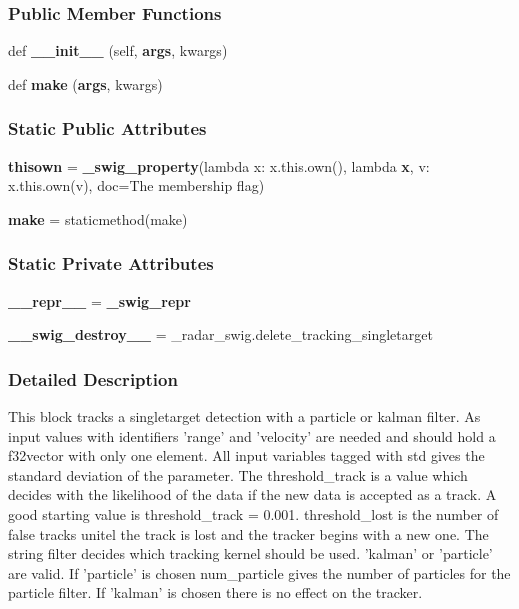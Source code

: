\subsubsection*{Public Member Functions}
\begin{DoxyCompactItemize}
\item 
def {\bf \+\_\+\+\_\+init\+\_\+\+\_\+} (self, {\bf args}, kwargs)
\item 
def {\bf make} ({\bf args}, kwargs)
\end{DoxyCompactItemize}
\subsubsection*{Static Public Attributes}
\begin{DoxyCompactItemize}
\item 
{\bf thisown} = {\bf \+\_\+swig\+\_\+property}(lambda x\+: x.\+this.\+own(), lambda {\bf x}, v\+: x.\+this.\+own(v), doc=\textquotesingle{}The membership flag\textquotesingle{})
\item 
{\bf make} = staticmethod(make)
\end{DoxyCompactItemize}
\subsubsection*{Static Private Attributes}
\begin{DoxyCompactItemize}
\item 
{\bf \+\_\+\+\_\+repr\+\_\+\+\_\+} = {\bf \+\_\+swig\+\_\+repr}
\item 
{\bf \+\_\+\+\_\+swig\+\_\+destroy\+\_\+\+\_\+} = \+\_\+radar\+\_\+swig.\+delete\+\_\+tracking\+\_\+singletarget
\end{DoxyCompactItemize}


\subsubsection{Detailed Description}
\begin{DoxyVerb}This block tracks a singletarget detection with a particle or kalman filter. As input values with identifiers 'range' and 'velocity' are needed and should hold a f32vector with only one element. All input variables tagged with std gives the standard deviation of the parameter. The threshold_track is a value which decides with the likelihood of the data if the new data is accepted as a track. A good starting value is threshold_track = 0.001. threshold_lost is the number of false tracks unitel the track is lost and the tracker begins with a new one. The string filter decides which tracking kernel should be used. 'kalman' or 'particle' are valid. If 'particle' is chosen num_particle gives the number of particles for the particle filter. If 'kalman' is chosen there is no effect on the tracker.\end{DoxyVerb}
 

